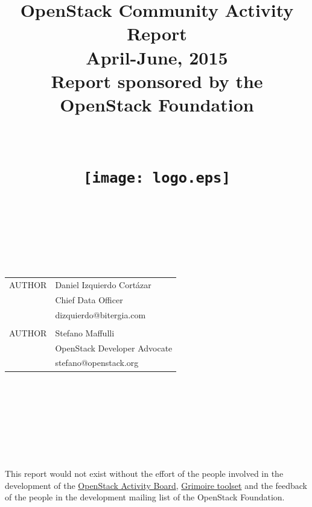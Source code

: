 \documentclass[a4wide,11pt]{report}
\begin{document}
\title{OpenStack Community Activity Report\\
      April-June, 2015 \\
      Report sponsored by the OpenStack Foundation\\
        ~~\\~~\\  \texttt{[image: logo.eps]}       \\}




\maketitle


\newpage
~~\\~\\~\\~\\
\begin{tabular}{p{5cm}p{10cm}}
AUTHOR & Daniel Izquierdo Cort\'azar \\
       & Chief Data Officer  \\
       & dizquierdo@bitergia.com \\
       &  \\
AUTHOR  & Stefano Maffulli \\
        & OpenStack Developer Advocate \\
        & stefano@openstack.org \\
\end{tabular}

~~\\~~\\


~~\\
~~\\

\begin{tabular}{p{5cm}p{10cm}}

\end{tabular}

~~\\
~~\\

This report would not exist without the effort of the people involved in the development of the \href{https://activity.openstack.org/dash}{OpenStack Activity Board}, \href{http://metricsgrimoire.github.io}{Grimoire toolset} and the feedback of the people in the development mailing list of the OpenStack Foundation.
\end{document}

